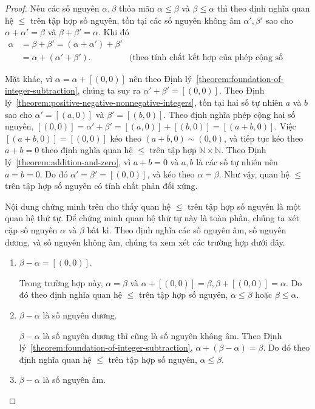 \begin{proof}
	Nếu các số nguyên $\alpha, \beta$ thỏa mãn $\alpha\leq\beta$ và $\beta\leq\alpha$ thì theo định nghĩa quan hệ $\leq$ trên tập hợp số nguyên, tồn tại các số nguyên không âm $\alpha', \beta'$ sao cho $\alpha + \alpha' = \beta$ và $\beta + \beta' = \alpha$. Khi đó
	\begin{align*}
		\alpha & = \beta + \beta' = (\alpha + \alpha') + \beta'                                                           \\
		       & = \alpha + (\alpha' + \beta').                 & \text{(theo tính chất kết hợp của phép cộng số nguyên)}
	\end{align*}

	Mặt khác, vì $\alpha = \alpha + [(0,0)]$ nên theo Định lý~\ref{theorem:foundation-of-integer-subtraction}, chúng ta suy ra $\alpha' + \beta' = [(0,0)]$. Theo Định lý~\ref{theorem:positive-negative-nonnegative-integers}, tồn tại hai số tự nhiên $a$ và $b$ sao cho $\alpha' = [(a, 0)]$ và $\beta' = [(b, 0)]$. Theo định nghĩa phép cộng hai số nguyên, $[(0, 0)] = \alpha' + \beta' = [(a, 0)] + [(b, 0)] = [(a+b, 0)]$. Việc $[(a+b, 0)] = [(0,0)]$ kéo theo $(a+b, 0)\sim (0,0)$, và tiếp tục kéo theo $a + b = 0$ theo định nghĩa quan hệ $\leq$ trên tập hợp $\mathbb{N}\times\mathbb{N}$. Theo Định lý~\ref{theorem:addition-and-zero}, vì $a + b = 0$ và $a, b$ là các số tự nhiên nên $a = b = 0$. Do đó $\alpha' = \beta' = [(0, 0)]$, và kéo theo $\alpha = \beta$. Như vậy, quan hệ $\leq$ trên tập hợp số nguyên có tính chất phản đối xứng.

	Nội dung chứng minh trên cho thấy quan hệ $\leq$ trên tập hợp số nguyên là một quan hệ thứ tự. Để chứng minh quan hệ thứ tự này là toàn phần, chúng ta xét cặp số nguyên $\alpha$ và $\beta$ bất kì. Theo định nghĩa các số nguyên âm, số nguyên dương, và số nguyên không âm, chúng ta xem xét các trường hợp dưới đây.
	\begin{enumerate}[label={\textbf{Trường hợp \arabic*.}},itemindent=2cm]
		\item $\beta - \alpha = [(0,0)]$.

		      Trong trường hợp này, $\alpha = \beta$ và $\alpha + [(0,0)] = \beta, \beta + [(0, 0)] = \alpha$. Do đó theo định nghĩa quan hệ $\leq$ trên tập hợp số nguyên, $\alpha\leq\beta$ hoặc $\beta\leq\alpha$.
		\item $\beta - \alpha$ là số nguyên dương.

		      $\beta - \alpha$ là số nguyên dương thì cũng là số nguyên không âm. Theo Định lý~\ref{theorem:foundation-of-integer-subtraction}, $\alpha + (\beta - \alpha) = \beta$. Do đó theo định nghĩa quan hệ $\leq$ trên tập hợp số nguyên, $\alpha\leq\beta$.
		\item $\beta - \alpha$ là số nguyên âm.


\end{enumerate}
\end{proof}
